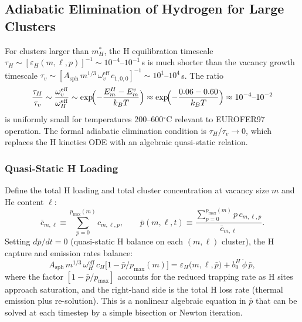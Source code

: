 \subsection{Adiabatic Elimination of Hydrogen for Large Clusters}
\label{sec:H_adiabatic}

For clusters larger than $m_H^*$, the H equilibration timescale
$\tau_H \sim [\varepsilon_H(m,\ell,p)]^{-1} \sim 10^{-4}$--$10^{-1}$\,s
is much shorter than the vacancy growth timescale
$\tau_v \sim [A_{\mathrm{sph}}\,m^{1/3}\,\omega_v^{\mathrm{eff}}\,c_{1,0,0}]^{-1}
\sim 10^1$--$10^4$\,s.  The ratio
\begin{equation}\label{eq:H_timescale_ratio}
    \frac{\tau_H}{\tau_v}
    \sim \frac{\omega_v^{\mathrm{eff}}}{\omega_H^{\mathrm{eff}}}
    \sim \exp\!\Bigl(-\frac{E_m^H - E_m^v}{k_BT}\Bigr)
    \approx \exp\!\Bigl(-\frac{0.06 - 0.60}{k_BT}\Bigr)
    \approx 10^{-4}\text{--}10^{-2}
\end{equation}
is uniformly small for temperatures 200--600$^\circ$C relevant to
EUROFER97 operation.  The formal adiabatic elimination condition is
$\tau_H / \tau_v \to 0$, which replaces the H kinetics ODE with an
algebraic quasi-static relation.

\subsubsection{Quasi-Static H Loading}
\label{sec:H_qss}

Define the total H loading and total cluster concentration at vacancy
size $m$ and He content $\ell$:
\begin{equation}
    \bar{c}_{m,\ell} \equiv \sum_{p=0}^{p_{\max}(m)} c_{m,\ell,p},
    \qquad
    \bar{p}(m,\ell,t)
    \equiv \frac{\displaystyle\sum_{p=0}^{p_{\max}(m)} p\,c_{m,\ell,p}}
               {\bar{c}_{m,\ell}}.
\end{equation}
Setting $d\bar{p}/dt = 0$ (quasi-static H balance on each
$(m,\ell)$ cluster), the H capture and emission rates balance:
\begin{equation}\label{eq:H_qss}
    A_{\mathrm{sph}}\,m^{1/3}\,\omega_H^{\mathrm{eff}}\,c_H
    \bigl[1 - \bar{p}/p_{\max}(m)\bigr]
    = \varepsilon_H\bigl(m,\ell,\bar{p}\bigr)
    + b_0^H\,\dot{\phi}\,\bar{p},
\end{equation}
where the factor $[1 - \bar{p}/p_{\max}]$ accounts for the reduced
trapping rate as H sites approach saturation, and the right-hand side
is the total H loss rate (thermal emission plus re-solution).  This is
a nonlinear algebraic equation in $\bar{p}$ that can be solved at each
timestep by a simple bisection or Newton iteration.

